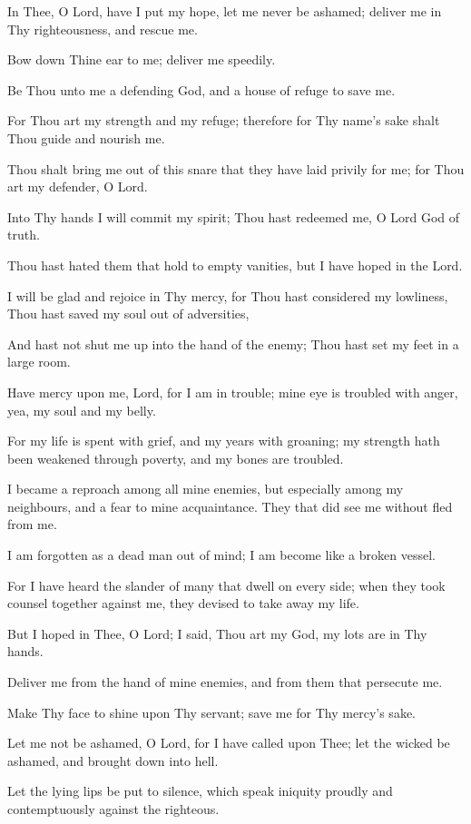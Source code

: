 In Thee, O Lord, have I put my hope, let me never be ashamed; deliver me in Thy righteousness, and rescue me.

Bow down Thine ear to me; deliver me speedily.

Be Thou unto me a defending God, and a house of refuge to save me.

For Thou art my strength and my refuge; therefore for Thy name's sake shalt Thou guide and nourish me.

Thou shalt bring me out of this snare that they have laid privily for me; for Thou art my defender, O Lord.

Into Thy hands I will commit my spirit; Thou hast redeemed me, O Lord God of truth.

Thou hast hated them that hold to empty vanities, but I have hoped in the Lord.

I will be glad and rejoice in Thy mercy, for Thou hast considered my lowliness, Thou hast saved my soul out of adversities,

And hast not shut me up into the hand of the enemy; Thou hast set my feet in a large room.

Have mercy upon me, Lord, for I am in trouble; mine eye is troubled with anger, yea, my soul and my belly.

For my life is spent with grief, and my years with groaning; my strength hath been weakened through poverty, and my bones are
troubled.

I became a reproach among all mine enemies, but especially among my neighbours, and a fear to mine acquaintance. They that did see me without fled from me.

I am forgotten as a dead man out of mind; I am become like a broken vessel.

For I have heard the slander of many that dwell on every side; when they took counsel together against me, they devised to take away my life.

But I hoped in Thee, O Lord; I said, Thou art my God, my lots are in Thy hands.

Deliver me from the hand of mine enemies, and from them that persecute me.

Make Thy face to shine upon Thy servant; save me for Thy mercy’s sake.

Let me not be ashamed, O Lord, for I have called upon Thee; let the wicked be ashamed, and brought down into hell.

Let the lying lips be put to silence, which speak iniquity proudly and contemptuously against the righteous.

